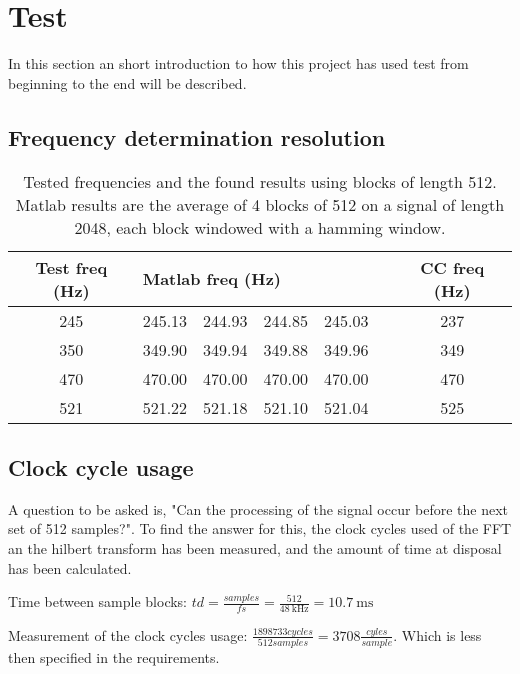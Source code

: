 
\section{Test}
\label{sec:test}
In this section an short introduction to how this project has used test from beginning to the end will be described.
\subsection{Frequency determination resolution}
\begin{table}
	\centering
	\begin{tabular}{c | c c c c c | c}
		\toprule
		Test freq (Hz) & \multicolumn{4}{l}{Matlab freq (Hz)} & & CC freq (Hz) \\
		\midrule
		\num{245} & \num{245.13} & \num{244.93} & \num{244.85} & \num{245.03} && \num{237}\\
		\num{350} & \num{349.90} & \num{349.94} & \num{349.88} & \num{349.96} && \num{349}\\
		\num{470} & \num{470.00} & \num{470.00} & \num{470.00} & \num{470.00} && \num{470} \\
		\num{521} & \num{521.22} & \num{521.18} & \num{521.10} & \num{521.04} && \num{525} \\
		\bottomrule
	\end{tabular}
	\caption{Tested frequencies and the found results using blocks of length \num{512}. Matlab results are the average of 4 blocks of \num{512} on a signal of length \num{2048}, each block windowed with a hamming window.}
	\label{tab:test}
\end{table}

\subsection{Clock cycle usage}
A question to be asked is, "Can the processing of the signal occur before the next set of 512 samples?".
To find the answer for this, the clock cycles used of the FFT an the hilbert transform has been measured, and the amount of time at disposal has been calculated.

Time between sample blocks:
$td = \frac{samples}{fs} = \frac{512}{\SI{48}{\kilo\hertz}} = \SI{10.7}{\milli\second}$

Measurement of the clock cycles usage:
$\frac{1898733 cycles}{512 samples} = 3708 \frac{cyles}{sample}$.
Which is less then specified in the requirements.


